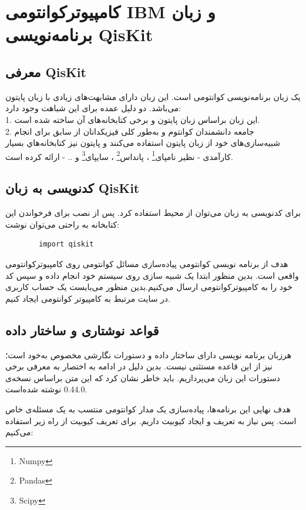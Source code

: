 \documentclass{book}
\begin{document}
\section{کامپیوترکوانتومی IBM و زبان برنامه‌نویسی QisKit}\label{sec:Qiskit}

\subsection{معرفی QisKit}
یک زبان برنامه‌نویسی کوانتومی است. این زبان دارای مشابهت‌های زیادی با زبان پایتون می‌باشد. دو دلیل عمده برای این شباهت وجود دارد:\\
 1. این زبان براساس زبان پایتون و برخی کتابخانه‌های آن ساخته شده است. \\
 2. جامعه دانشمندان کوانتوم و به‌طور کلی فیزیکدانان از سابق برای انجام شبیه‌سازی‌های خود از زبان پایتون استفاده می‌کنند و پایتون نیز کتابخانه‌هاي بسیار کارآمدی - نظیر نامپای\footnote{Numpy} ، پانداس\footnote{Pandas} ، سایپای\footnote{Scipy} و .. - ارائه کرده است.

\subsection{کدنویسی به زبان QisKit}
برای کدنویسی به زبان  می‌توان از محیط  استفاده کرد. پس از نصب  برای فرخواندن این کتابخانه به راحتی می‌توان نوشت:

\begin{latin}
	\begin{verbatim}
		import qiskit
	\end{verbatim}
\end{latin}

هدف از برنامه نویسی کوانتومی پیاده‌سازی مسائل کوانتومی روی کامپیوتر‌کوانتومی‌ واقعی است. بدین منظور ابتدا یک شبیه سازی روی سیستم خود انجام داده و سپس کد خود را به کامپیوتر‌کوانتومی  ارسال می‌کنیم.بدین منظور می‌بایست یک حساب کاربری در سایت مرتبط به کامپیوتر کوانتومی  ایجاد کنیم.


\subsection{قواعد نوشتاری و ساختار داده}
هرزبان برنامه نویسی دارای ساختار داده و دستورات نگارشی مخصوص به‌خود است؛  نیز از این قاعده مستثنی نیست. بدین دلیل در ادامه به اختصار به معرفی برخی دستورات این زبان می‌پردازیم. باید خاطر نشان کرد که این متن براساس  نسخه‌ی  0.44.0 نوشته‌ شده‌است.

هدف نهایی این برنامه‌ها، پیاده‌سازی یک مدار کوانتومی‌ منتسب به یک مسئله‌ی خاص است. پس نیاز به تعریف و ایجاد کیوبیت داریم. برای تعریف کیوبیت از راه زیر استفاده می‌کنیم:
\end{document}
